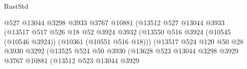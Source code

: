 \begin{lexlean}{RustStd}
\begin{coremodule}
                                                @527
                                                @13044
                                                @3298
                                                @3933
                                                @3767
                                                @10881
                                                (@13512
                                                  @527
                                                  @13044
                                                  @3933
                                                  (@13517
                                                    @517
                                                    @526
                                                    @18
                                                    @52
                                                    @3924
                                                    @3932
                                                    (@13550
                                                      @516
                                                      @3924
                                                      (@10545 (@10546 @3924))
                                                      (@10361 (@10551 @516 @18)))
                                                    (@13517
                                                      @524
                                                      @120
                                                      @50
                                                      @28
                                                      @3930
                                                      @3292
                                                      (@13525
                                                        @524
                                                        @50
                                                        @3930
                                                        (@13628
                                                          @523
                                                          @13044
                                                          @3298
                                                          @3929
                                                          @3767
                                                          @10881
                                                          (@13512
                                                            @523
                                                            @13044
                                                            @3929

\end{coremodule}
\end{lexlean}
